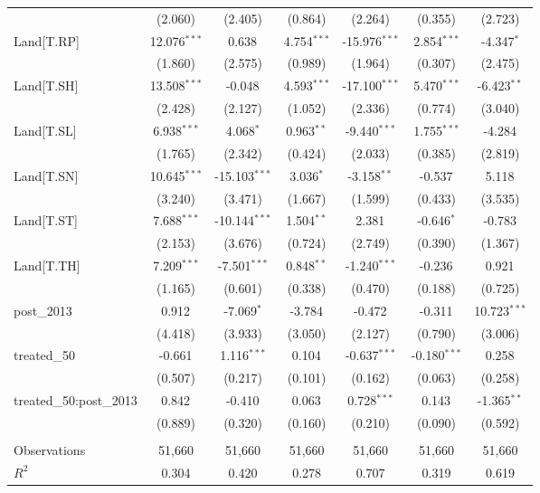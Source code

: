 \begin{table}[!htbp]
\begin{tabular}{@{\extracolsep{5pt}}lcccccc}
  & (2.060) & (2.405) & (0.864) & (2.264) & (0.355) & (2.723) \\
 Land[T.RP] & 12.076$^{***}$ & 0.638$^{}$ & 4.754$^{***}$ & -15.976$^{***}$ & 2.854$^{***}$ & -4.347$^{*}$ \\
  & (1.860) & (2.575) & (0.989) & (1.964) & (0.307) & (2.475) \\
 Land[T.SH] & 13.508$^{***}$ & -0.048$^{}$ & 4.593$^{***}$ & -17.100$^{***}$ & 5.470$^{***}$ & -6.423$^{**}$ \\
  & (2.428) & (2.127) & (1.052) & (2.336) & (0.774) & (3.040) \\
 Land[T.SL] & 6.938$^{***}$ & 4.068$^{*}$ & 0.963$^{**}$ & -9.440$^{***}$ & 1.755$^{***}$ & -4.284$^{}$ \\
  & (1.765) & (2.342) & (0.424) & (2.033) & (0.385) & (2.819) \\
 Land[T.SN] & 10.645$^{***}$ & -15.103$^{***}$ & 3.036$^{*}$ & -3.158$^{**}$ & -0.537$^{}$ & 5.118$^{}$ \\
  & (3.240) & (3.471) & (1.667) & (1.599) & (0.433) & (3.535) \\
 Land[T.ST] & 7.688$^{***}$ & -10.144$^{***}$ & 1.504$^{**}$ & 2.381$^{}$ & -0.646$^{*}$ & -0.783$^{}$ \\
  & (2.153) & (3.676) & (0.724) & (2.749) & (0.390) & (1.367) \\
 Land[T.TH] & 7.209$^{***}$ & -7.501$^{***}$ & 0.848$^{**}$ & -1.240$^{***}$ & -0.236$^{}$ & 0.921$^{}$ \\
  & (1.165) & (0.601) & (0.338) & (0.470) & (0.188) & (0.725) \\
 post_2013 & 0.912$^{}$ & -7.069$^{*}$ & -3.784$^{}$ & -0.472$^{}$ & -0.311$^{}$ & 10.723$^{***}$ \\
  & (4.418) & (3.933) & (3.050) & (2.127) & (0.790) & (3.006) \\
 treated_50 & -0.661$^{}$ & 1.116$^{***}$ & 0.104$^{}$ & -0.637$^{***}$ & -0.180$^{***}$ & 0.258$^{}$ \\
  & (0.507) & (0.217) & (0.101) & (0.162) & (0.063) & (0.258) \\
 treated_50:post_2013 & 0.842$^{}$ & -0.410$^{}$ & 0.063$^{}$ & 0.728$^{***}$ & 0.143$^{}$ & -1.365$^{**}$ \\
  & (0.889) & (0.320) & (0.160) & (0.210) & (0.090) & (0.592) \\
\hline \\[-1.8ex]
 Observations & 51,660 & 51,660 & 51,660 & 51,660 & 51,660 & 51,660 \\
 $R^2$ & 0.304 & 0.420 & 0.278 & 0.707 & 0.319 & 0.619 \\

\end{tabular}
\end{table}
